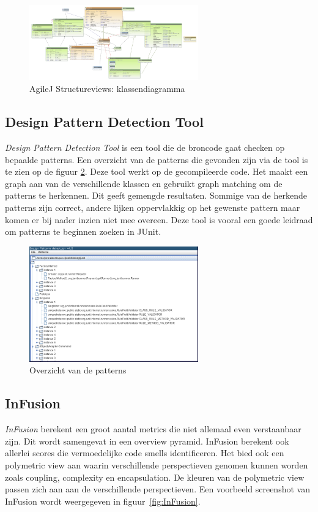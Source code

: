 \documentclass[i1]{oss}
\begin{document}
\begin{figure}[!ht]
	\centering
	\includegraphics[width=0.65\textwidth]{AgileJKlassendiagramma}
	\caption{AgileJ Structureviews: klassendiagramma}
	\label{fig:AgileJKlassendia}
\end{figure}

\subsection{Design Pattern Detection Tool}
\emph{Design Pattern Detection Tool} is een tool die de broncode gaat checken op bepaalde patterns. Een overzicht van de patterns die gevonden zijn via de tool is te zien op de figuur \ref{fig:DesignPatterns}. Deze tool werkt op de gecompileerde code. Het maakt een graph aan van de verschillende klassen en gebruikt graph matching om de patterns te herkennen.  Dit geeft gemengde resultaten. Sommige van de herkende patterns zijn correct, andere lijken oppervlakkig op het gewenste pattern maar komen er bij nader inzien niet mee overeen. 
Deze tool is vooral een goede leidraad om patterns te beginnen zoeken in JUnit.\\

\begin{figure}[h!]
	\centering
	\includegraphics[width=0.65\textwidth]{Patterns1}
	\caption{Overzicht van de patterns}
	\label{fig:DesignPatterns}
\end{figure}

\subsection{InFusion}
\emph{InFusion} berekent een groot aantal metrics die niet allemaal even verstaanbaar zijn. Dit wordt samengevat in een overview pyramid. InFusion berekent ook allerlei scores die vermoedelijke code smells identificeren. Het bied ook een polymetric view aan waarin verschillende perspectieven genomen kunnen worden zoals coupling, complexity en encapsulation. De kleuren van de polymetric view passen zich aan aan de verschillende perspectieven. Een voorbeeld screenshot van InFusion wordt weergegeven in figuur~\ref{fig:InFusion}.
\end{document}
